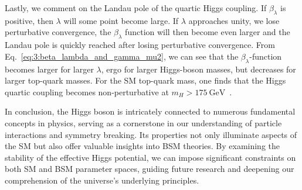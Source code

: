 Lastly, we comment on the Landau pole of the quartic Higgs coupling. If $\beta_\lambda$ is positive, then $\lambda$ will some point become large. If $\lambda$ approaches unity, we lose perturbative convergence, the $\beta_\lambda$ function will then become even larger and the Landau pole is quickly reached after losing perturbative convergence. From  Eq.~\eqref{eq:3:beta_lambda_and_gamma_mu2}, we can see that the $\beta_\lambda$-function becomes larger for larger $\lambda$, ergo for larger Higgs-boson masses, but decreases for larger top-quark masses. For the \acs{SM} top-quark mass, one finds that the Higgs quartic coupling becomes non-perturbative at $m_H > 175\ \mathrm{GeV}$~\cite{Degrassi:2012ry}.

In conclusion, the Higgs boson is intricately connected to numerous fundamental concepts in physics, serving as a cornerstone in our understanding of particle interactions and symmetry breaking. Its properties not only illuminate aspects of the \acs{SM} but also offer valuable insights into \acs{BSM} theories. By examining the stability of the effective Higgs potential, we can impose significant constraints on both \acs{SM} and \acs{BSM} parameter spaces, guiding future research and deepening our comprehension of the universe's underlying principles.
